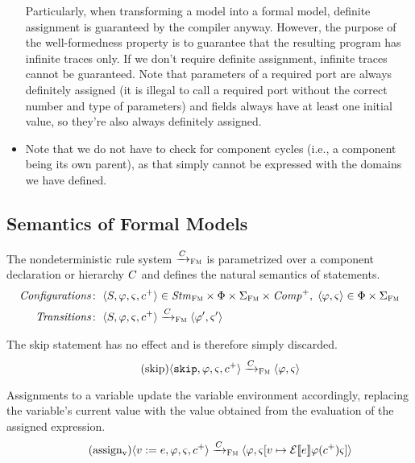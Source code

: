 \documentclass[a4paper,10pt,english]{article}
\begin{document}
\begin{itemize}
	Particularly, when transforming a \SSharp model into a formal model, definite assignment is guaranteed by the \CSharp compiler
	anyway. However, the purpose of the well-formedness property is to guarantee that the resulting \Fil program
	has infinite traces only. If we don't require definite assignment, infinite traces cannot be guaranteed. Note that parameters
	of a required port are always definitely assigned (it is illegal to call a required port without the correct number and type of
	parameters) and fields always have at least one initial value, so they're also always definitely assigned.
	\item Note that we do not have to check for component cycles (i.e., a component being its own parent), as that simply cannot be
	expressed with the domains we have defined.
\end{itemize}

\subsection{Semantics of Formal Models}
The nondeterministic rule system $\xrightarrow{C}_\textsc{Fm}$ is parametrized over a component declaration or hierarchy $C$ and defines
the natural semantics of statements.
\begin{align*}
	\mathit{Configurations} \colon & \;\langle S, \varphi, \varsigma, c^+ \rangle \in \mathit{Stm}_\textsc{Fm} \times \Phi \times
	\Sigma_\textsc{Fm} \times \mathit{Comp}^+, \; \langle \varphi, \varsigma \rangle \in \Phi \times \Sigma_\textsc{Fm}
	\\
	\mathit{Transitions} \colon & \;\langle S, \varphi, \varsigma, c^+ \rangle \xrightarrow{C}_\textsc{Fm}
	\langle \varphi', \varsigma' \rangle
\end{align*}

The skip statement has no effect and is therefore simply discarded.
\begin{equation*}
	\tag{skip}
	\langle \mathtt{skip}, \varphi, \varsigma, c^+ \rangle
		\xrightarrow{C}_\textsc{Fm}
	\langle \varphi, \varsigma \rangle
\end{equation*}

Assignments to a variable update the variable environment accordingly, replacing the variable's current value with the value
obtained from the evaluation of the assigned expression.
\begin{equation*}
	\tag{assign${}_\text{v}$}
	\configurationFm{\assignVarStm{\var}{\expr}, \fieldEnv, \varEnvFm, \toListNE{\comp}}
		\stmArrowFm
	\configurationFm{\fieldEnv, \varEnvFm[\var \mapsto \ExprSem{\expr} \fieldEnv(\toListNE{\comp}) \varEnvFm]}
\end{equation*}
\end{document}
